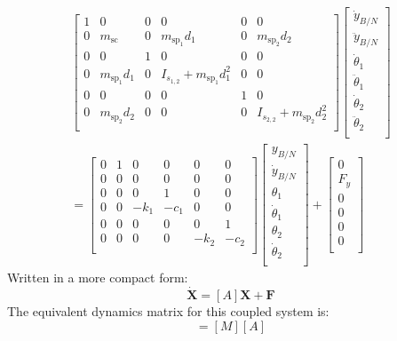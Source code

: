 \begin{multline}
\begin{bmatrix}
1 & 0 & 0 & 0 & 0 & 0\\
0 & m_{\text{sc}} & 0 & m_{\text{sp}_1} d_1 & 0 & m_{\text{sp}_2} d_2 \\
0 & 0 & 1 & 0 & 0 & 0\\
0 & m_{\text{sp}_1} d_1 & 0 &  I_{s_{1,2}} + m_{\text{sp}_1} d_1^{2} & 0 & 0 \\
0 & 0 & 0 & 0 & 1 & 0\\
0 & m_{\text{sp}_2} d_2 & 0 & 0 & 0 & I_{s_{2,2}} + m_{\text{sp}_2} d_2^{2} \\
\end{bmatrix}
\begin{bmatrix}
\dot{y}_{B/N} \\
\ddot{y}_{B/N} \\
\dot \theta_1 \\
\ddot \theta_1 \\
\dot \theta_2 \\
\ddot \theta_2 \\
\end{bmatrix}
\\
=\begin{bmatrix}
0 & 1 & 0 & 0 & 0 & 0\\
0 & 0 & 0 & 0 & 0 & 0\\
0 & 0 & 0 & 1 & 0 & 0\\
0 & 0 & -k_1 & -c_1 & 0 & 0\\
0 & 0 & 0 & 0 & 0 & 1\\
0 & 0 & 0 & 0 & -k_2 & -c_2\\
\end{bmatrix}
\begin{bmatrix}
{y}_{B/N} \\
\dot{y}_{B/N} \\
\theta_1 \\
\dot \theta_1 \\
\theta_2 \\
\dot \theta_2 \\
\end{bmatrix}
+ \begin{bmatrix}
0 \\
F_y \\
0 \\
0 \\
0 \\
0 \\
\end{bmatrix}
\label{eq:solar_panel_final13}
\end{multline}
Written in a more compact form:
\begin{equation}
[M] \dot{\bm X} = [A] \bm X + \bm F
\end{equation}
The equivalent dynamics matrix for this coupled system is:
\begin{equation}
[\tilde{A}] = [M][A]
\end{equation}

